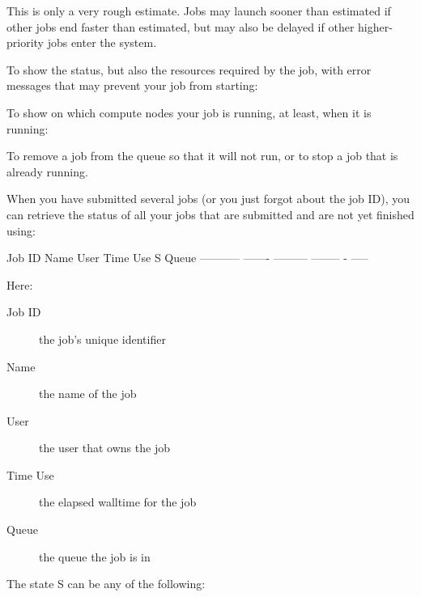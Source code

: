 \begin{prompt}
\end{prompt}

  This is only a very rough estimate. Jobs may launch sooner than estimated if
  other jobs end faster than estimated, but may also be delayed if other
  higher-priority jobs enter the system.

  To show the status, but also the resources required by the job, with error
  messages that may prevent your job from starting:

\begin{prompt}
\end{prompt}
\fi
\fi

To show on which compute nodes your job is running, at least, when it is
running:

\begin{prompt}
\end{prompt}

To remove a job from the queue so that it will not run, or to stop a job that
is already running.

\begin{prompt}
\end{prompt}

When you have submitted several jobs (or you just forgot about the job ID), you
can retrieve the status of all your jobs that are submitted and are not yet
finished using:

\begin{prompt}
Job ID      Name    User      Time Use S Queue
----------- ------- --------- -------- - -----
\end{prompt}

Here:
\begin{description}
  \item[Job ID] the job's unique identifier
  \item[Name] the name of the job
  \item[User] the user that owns the job
  \item[Time Use] the elapsed walltime for the job
  \item[Queue] the queue the job is in
\end{description}

The state S can be any of  the following:

